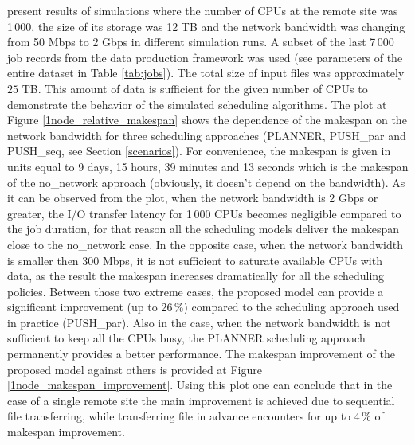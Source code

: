 \documentclass{svjour3}                     %
\begin{document}
present results of simulations where the number of CPUs at the remote site was 1\,000, the size of its storage was 12 TB and the network bandwidth was changing from 50 Mbps to 2 Gbps in different simulation runs. A subset of the last 7\,000 job records from the data production framework was used (see parameters of the entire dataset in Table \ref{tab:jobs}). The total size of input files was approximately $25$ TB. This amount of data is sufficient for the given number of CPUs to demonstrate the behavior of the simulated scheduling algorithms. The plot at Figure \ref{1node_relative_makespan} shows the dependence of the makespan on the network bandwidth for three scheduling approaches (PLANNER, PUSH\_par and PUSH\_seq, see Section \ref{scenarios}). For convenience, the makespan is given in units equal to 9 days, 15 hours, 39 minutes and 13 seconds which is the makespan of the no\_network approach (obviously, it doesn't depend on the bandwidth). As it can be observed from the plot, when the network bandwidth is 2 Gbps or greater, the I/O transfer latency for 1\,000 CPUs becomes negligible compared to the job duration, for that reason all the scheduling models deliver the makespan close to the no\_network case. In the opposite case, when the network bandwidth is smaller then 300 Mbps, it is not sufficient to saturate available CPUs with data, as the result the makespan increases dramatically for all the scheduling policies. Between those two extreme cases, the proposed model can provide a significant improvement (up to 26\,\%) compared to the scheduling approach used in practice (PUSH\_par). Also in the case, when the network bandwidth is not sufficient to keep all the CPUs busy, the PLANNER scheduling approach permanently provides a better performance. The makespan improvement of the proposed model against others is provided at Figure \ref{1node_makespan_improvement}. Using this plot one can conclude that in the case of a single remote site the main improvement is achieved due to sequential file transferring, while transferring file in advance encounters for up to 4\,\% of makespan improvement.
\end{document}
